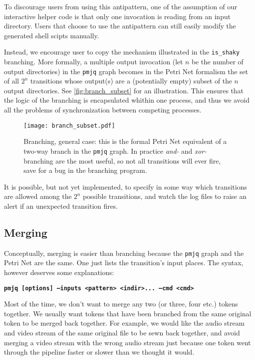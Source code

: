 \documentclass[letterpaper,twocolumn,10pt]{article}
\begin{document}
To discourage users from using this antipattern, one of the assumption of our interactive helper code is that only one invocation is reading from an input directory. Users that choose to use the antipattern can still easily modify the generated shell scipts manually.

Instead, we encourage user to copy the mechanism illustrated in the {\tt is\_shaky} branching. More formally, a multiple output invocation (let $n$ be the number of output directories) in the {\tt pmjq} graph becomes in the Petri Net formalism the set of all $2^n$ transitions whose output(s) are a (potentially empty) subset of the $n$ output directories. See \autoref{fig:branch_subset} for an illustration. This ensures that the logic of the branching is encapsulated whithin one process, and thus we avoid all the problems of synchronization between competing processes.


\begin{figure}[t]
\begin{center}
\texttt{[image: branch\_subset.pdf]}
\end{center}
\caption{Branching, general case: this is the formal Petri Net equivalent of a two-way branch in the {\tt pmjq} graph. In practice \emph{and-} and \emph{xor-}branching are the most useful, so not all transitions will ever fire, save for a bug in the branching program.}
\label{fig:branch_subset}
\end{figure}

It is possible, but not yet implemented, to specify in some way which transitions are allowed among the $2^n$ possible transitions, and watch the log files to raise an alert if an unexpected transition fires.

\subsection{Merging}
\label{sec:merging}
Conceptually, merging is easier than branching because the {\tt pmjq} graph and the Petri Net are the same. One just lists the transition's input places. The syntax, however deserves some explanations:

{\bf \tt pmjq [options] --inputs <pattern> <indir>... --cmd <cmd> \\}

Most of the time, we don't want to merge any two (or three, four etc.) tokens together. We usually want tokens that have been branched from the same original token to be merged back together. For example, we would like the audio stream and video stream of the same original file to be sewn back together, and avoid merging a video stream with the wrong audio stream just because one token went through the pipeline faster or slower than we thought it would.
\end{document}
